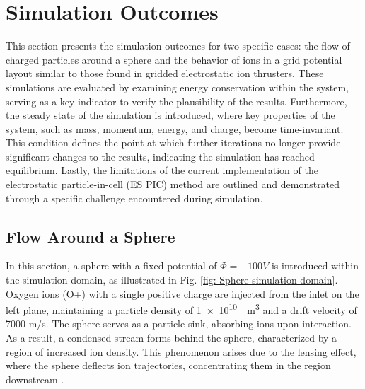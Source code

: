 \section{Simulation Outcomes}\label{Sec: Simulation Outcomes}

This section presents the simulation outcomes for two specific cases: the flow of charged particles around a sphere and the behavior of ions in a grid potential layout similar to those found in gridded electrostatic ion thrusters. These simulations are evaluated by examining energy conservation within the system, serving as a key indicator to verify the plausibility of the results. Furthermore, the steady state of the simulation is introduced, where key properties of the system, such as mass, momentum, energy, and charge, become time-invariant. This condition defines the point at which further iterations no longer provide significant changes to the results, indicating the simulation has reached equilibrium. Lastly, the limitations of the current implementation of the electrostatic particle-in-cell (\acs{ES PIC}) method are outlined and demonstrated through a specific challenge encountered during simulation.

\subsection{Flow Around a Sphere}\label{Sec: Flow Around Sphere}

In this section, a sphere with a fixed potential of $\Phi = -100V$ is introduced within the simulation domain, as illustrated in Fig. \ref{fig: Sphere simulation domain}. Oxygen ions (O+) with a single positive charge are injected from the inlet on the left plane, maintaining a particle density of \SI{1e10}{\per\meter^3} and a drift velocity of 7000 m/s. The sphere serves as a particle sink, absorbing ions upon interaction. As a result, a condensed stream forms behind the sphere, characterized by a region of increased ion density. This phenomenon arises due to the lensing effect, where the sphere deflects ion trajectories, concentrating them in the region downstream \cite{brieda_plasma_2019}.

